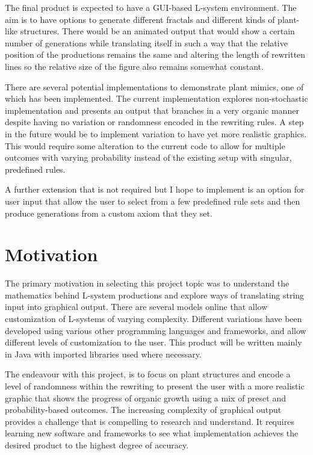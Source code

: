 \documentclass[]{interim_report}
\begin{document}
The final product is expected to have a GUI-based L-system environment. The aim is to have options to generate different fractals and different kinds of plant-like structures. There would be an animated output that would show a certain number of generations while translating itself in such a way that the relative position of the productions remains the same and altering the length of rewritten lines so the relative size of the figure also remains somewhat constant. 

There are several potential implementations to demonstrate plant mimics, one of which has been implemented. The current implementation explores non-stochastic implementation and presents an output that branches in a very organic manner despite having no variation or randomness encoded in the rewriting rules. A step in the future would be to implement variation to have yet more realistic graphics. This would require some alteration to the current code to allow for multiple outcomes with varying probability instead of the existing setup with singular, predefined rules.

A further extension that is not required but I hope to implement is an option for user input that allow the user to select from a few predefined rule sets and then produce generations from a custom axiom that they set.

\section{Motivation}

The primary motivation in selecting this project topic was to understand the mathematics behind L-system productions and explore ways of translating string input into graphical output. There are several models online that allow customization of L-systems of varying complexity. Different variations have been developed using various other programming languages and frameworks, and allow different levels of customization to the user. This product will be written mainly in Java with imported libraries used where necessary.

The endeavour with this project, is to focus on plant structures and encode a level of randomness within the rewriting to present the user with a more realistic graphic that shows the progress of organic growth using a mix of preset and probability-based outcomes. The increasing complexity of graphical output provides a challenge that is compelling to research and understand. It requires learning new software and frameworks to see what implementation achieves the desired product to the highest degree of accuracy.
\end{document}
